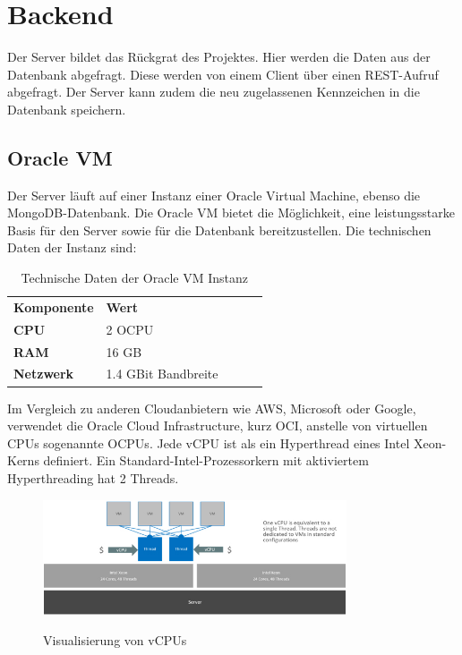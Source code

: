 \section{Backend}
Der Server bildet das Rückgrat des Projektes. Hier werden die Daten aus der Datenbank abgefragt. Diese werden von einem Client über einen REST-Aufruf abgefragt. Der Server kann zudem die neu zugelassenen Kennzeichen in die Datenbank speichern.
\subsection{Oracle VM}
Der Server läuft auf einer Instanz einer Oracle Virtual Machine, ebenso die MongoDB-Datenbank. Die Oracle VM bietet die Möglichkeit, eine leistungsstarke Basis für den Server sowie für die Datenbank bereitzustellen. Die technischen Daten der Instanz sind:
\begin{table}[ht]
    \caption{Technische Daten der Oracle VM Instanz}
    \label{tab:vm}
    \begin{tabular}{|l|llll}
    \cline{1-2}
    \textbf{Komponente} & \multicolumn{1}{l|}{\textbf{Wert}} &  &  &  \\ \cline{1-2}
    \textbf{CPU}        & 2 OCPU                             &  &  &  \\ \cline{1-1}
    \textbf{RAM}        & 16 GB                              &  &  &  \\ \cline{1-1}
    \textbf{Netzwerk}   & 1.4 GBit Bandbreite                &  &  &  \\ \cline{1-1}
    \end{tabular}
    \end{table}

    Im Vergleich zu anderen Cloudanbietern wie AWS, Microsoft oder Google, verwendet die Oracle Cloud Infrastructure, kurz OCI, anstelle von virtuellen CPUs sogenannte OCPUs. Jede vCPU ist als ein Hyperthread eines Intel Xeon-Kerns definiert. Ein Standard-Intel-Prozessorkern mit aktiviertem Hyperthreading hat 2 Threads.
\begin{figure}[H]
    \centering
    \includegraphics[width=0.8\textwidth]{pics/vCPU.jpg}
    \caption{Visualisierung von vCPUs}
    \cite{vcpuPic}
    \label{fig:vm:vCPU}
\end{figure}

